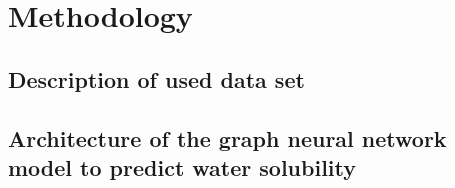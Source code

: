 \chapter{Methodology}


\section{Description of used data set}


\section{Architecture of the graph neural network model to predict water solubility}
